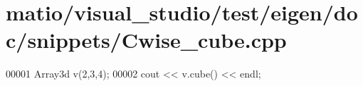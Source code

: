 \hypertarget{matio_2visual__studio_2test_2eigen_2doc_2snippets_2_cwise__cube_8cpp_source}{}\section{matio/visual\+\_\+studio/test/eigen/doc/snippets/\+Cwise\+\_\+cube.cpp}
\label{matio_2visual__studio_2test_2eigen_2doc_2snippets_2_cwise__cube_8cpp_source}

\begin{DoxyCode}
00001 Array3d v(2,3,4);
00002 cout << v.cube() << endl;
\end{DoxyCode}

